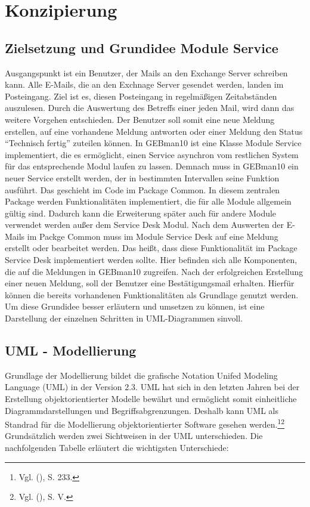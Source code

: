 \section{Konzipierung}

\subsection{Zielsetzung und Grundidee Module Service }
Ausgangspunkt ist ein Benutzer, der Mails an den Exchange Server schreiben kann. Alle E-Mails, die an den Exchnage Server gesendet werden, landen im Posteingang. Ziel ist es, diesen Posteingang in regelmäßigen Zeitabständen auszulesen. Durch die Auswertung des Betreffs einer jeden Mail, wird dann das weitere Vorgehen entschieden. Der Benutzer soll somit eine neue Meldung erstellen, auf eine vorhandene Meldung antworten oder einer Meldung den Status \enquote{Technisch fertig} zuteilen können.\newline 
In GEBman10  ist eine Klasse Module Service implementiert, die es ermöglicht, einen Service asynchron vom restlichen System für das entsprechende Modul laufen zu lassen. Demnach muss in GEBman10 ein neuer Service erstellt werden, der in bestimmten Intervallen seine Funktion ausführt. Das geschieht im Code im Package Common. In diesem zentralen Package werden Funktionalitäten implementiert, die für alle Module allgemein gültig sind. Dadurch kann die Erweiterung später auch für andere Module verwendet werden außer dem Service Desk Modul.\newline
Nach dem Auswerten der E-Mails im Packge Common muss im Module Service Desk auf eine Meldung erstellt oder bearbeitet werden. Das heißt, dass diese Funktionalität im Package Service Desk implementiert werden sollte. Hier befinden sich alle Komponenten, die auf die Meldungen in GEBman10 zugreifen. Nach der erfolgreichen Erstellung einer neuen Meldung, soll der Benutzer eine Bestätigungsmail erhalten. Hierfür können die bereits vorhandenen Funktionalitäten als Grundlage genutzt werden.\newline
Um diese Grundidee besser erläutern und umsetzen zu können, ist eine Darstellung der einzelnen Schritten in UML-Diagrammen sinvoll.



\subsection{UML - Modellierung}
\noindent
Grundlage der Modellierung bildet die grafische Notation Unifed Modeling Language (UML) in der Version 2.3. UML hat sich in den letzten Jahren bei der Erstellung objektorientierter Modelle bewährt und ermöglicht somit einheitliche Diagrammdarstellungen und Begriffsabgrenzungen. Deshalb kann UML als Standrad für die Modellierung objektorientierter Software gesehen werden.\footnote{Vgl. \citeauthor{Schneider} (\citeyear{Schneider}), S. 233.}\footnote{Vgl. \citeauthor{Balzert} (\citeyear{Balzert}), S. V.} \newline
Grundsätzlich werden zwei Sichtweisen in der UML unterschieden. Die nachfolgenden Tabelle erläutert die wichtigsten Unterschiede:

